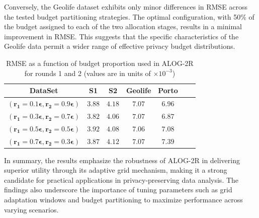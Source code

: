 Conversely, the Geolife dataset exhibits only minor differences in RMSE across the tested budget partitioning strategies. The optimal configuration, with 50\% of the budget assigned to each of the two allocation stages, results in a minimal improvement in RMSE. This suggests that the specific characteristics of the Geolife data permit a wider range of effective privacy budget distributions.
% 
\begin{table}[!tb]
\centering
\footnotesize
\caption{RMSE as a function of budget proportion used in ALOG-2R for rounds 1 and 2 (values are in units of $\times 10^{-3}$)}
\begin{tabular}{c|cccccc}
\toprule
\textbf{DataSet} & \textbf{S1} & \textbf{S2} & \textbf{Geolife} & \textbf{Porto} \\
\midrule
$\mathbf{(r_1=0.1\epsilon,r_2=0.9\epsilon)}$ & $3.88$ & $4.18 $ & $7.07 $ & $6.96$\\
$\mathbf{(r_1=0.3\epsilon,r_2=0.7\epsilon)}$ & \cellcolor{black!8}$\mathbf{3.82} $ & \cellcolor{black!8}$\mathbf{4.06} $ & $7.07 $ & \cellcolor{black!8}$\mathbf{6.87}$ \\
$\mathbf{(r_1=0.5\epsilon,r_2=0.5\epsilon)}$ & $3.92 $ & $4.08 $ & \cellcolor{black!8}$\mathbf{7.06} $ & $7.08 $ \\
$\mathbf{(r_1=0.7\epsilon,r_2=0.3\epsilon)}$ & $3.87$ & $4.12 $ & $7.07$ & $7.39$ \\
\bottomrule
\end{tabular}
\label{tab:bpmse}
\end{table}
% 
In summary, the results emphasize the robustness of ALOG-2R in delivering superior utility through its adaptive grid mechanism, making it a strong candidate for practical applications in privacy-preserving data analysis. The findings also underscore the importance of tuning parameters such as grid adaptation windows and budget partitioning to maximize performance across varying scenarios.

